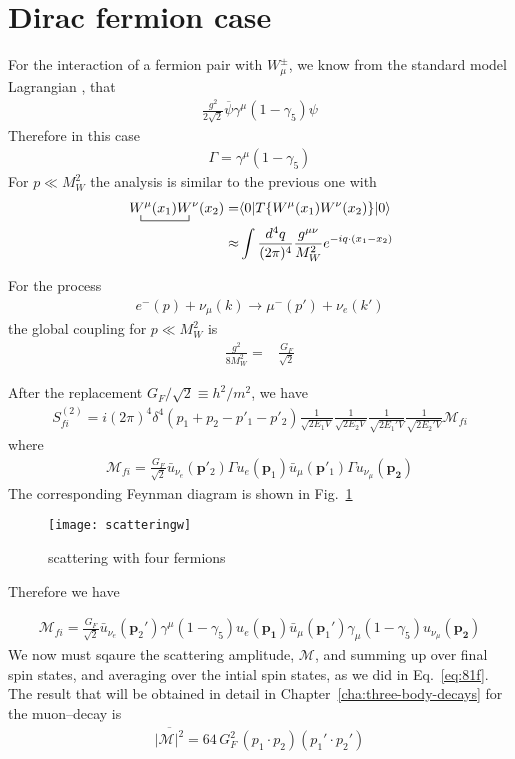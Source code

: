 \section{Dirac fermion case}


For the interaction of a fermion pair with $W_\mu^\pm$, we know from
the standard model Lagrangian \cite{lsm}, that
\begin{align}
  \frac{g^2}{2\sqrt{2}}\overline{\psi}\gamma^\mu(1-\gamma_5)\psi
\end{align}
Therefore in this case
\begin{align}
  \Gamma=\gamma^\mu(1-\gamma_5)
\end{align}
For $p\ll M_W^2$ the analysis is similar to the previous one with
\begin{align}
   \bcontraction{\,}{W^\mu}{(x_1)}{W^\nu}
\,W^\mu(x_1)W^\nu(x_2)=&\langle0|T\{W^\mu(x_1)W^\nu(x_2)\}|0\rangle\nonumber\\
\approx&\int\frac{d^4q}{(2\pi)^4}\frac{g^{\mu\nu}}{M_W^2}e^{-i q\cdot(x_1-x_2)}
\end{align}

For the process 
\begin{align}
  e^-(p)+\nu_\mu(k)\to\mu^-(p')+\nu_e(k')
\end{align}
the global coupling for $p\ll M_W^2$ is
\begin{align}
  \frac{g^2}{8M_W^2}=&\frac{G_F}{\sqrt{2}}
\end{align}

After the replacement $G_F/\sqrt{2}\equiv h^2/m^2$, we have
\begin{align}
  \label{eq:101f}
  S^{(2)}_{fi}=i(2\pi)^4\delta^{4}\left(p_1+p_2-p'_1-p'_2\right)
  \frac{1}{\sqrt{2E_1 V}}\frac{1}{\sqrt{2E_2 V}}
  \frac{1}{\sqrt{2E_1' V}}\frac{1}{\sqrt{2E_2' V}}
  \mathcal{M}_{fi}
\end{align}
where
\begin{align}
  \mathcal{M}_{fi}=\frac{G_F}{\sqrt{2}}
\bar{u}_{\nu_e}(\mathbf{p}'_2)\Gamma u_e(\mathbf{p}_1)\bar{u}_\mu(\mathbf{p}'_1)\Gamma u_{\nu_\mu}(\mathbf{p_2})
\end{align}
The corresponding Feynman diagram is shown in Fig.~\ref{fig:sw}
\begin{figure} %
  \centering %
  \texttt{[image: scatteringw]} %
  \caption{scattering with four fermions} %
  \label{fig:sw} %
\end{figure} %
Therefore we have

\begin{align}
  \mathcal{M}_{fi}=\frac{G_F}{\sqrt{2}}
\bar{u}_{\nu_e}(\mathbf{p}_2')\gamma^\mu(1-\gamma_5)u_e(\mathbf{p_1})
\bar{u}_\mu(\mathbf{p}_1')\gamma_\mu(1-\gamma_5)u_{\nu_\mu}(\mathbf{p_2})
\end{align}
We now must sqaure the scattering amplitude, $\mathcal{M}$, and summing up over final spin states, and averaging over the intial spin states, as we did in Eq.~\eqref{eq:81f}. The result that will be obtained in detail in Chapter~\ref{cha:three-body-decays} for the muon--decay is
\begin{align}
  \label{eq:102f}
  \overline{|\mathcal{M}|^2}=64\,G_F^2\,(p_1\cdot p_2)(p_1'\cdot p_2')
\end{align}

